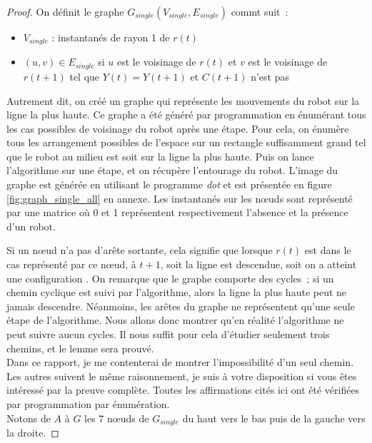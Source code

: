 \begin{proof}
On définit le graphe $G_{single}(V_{single}, E_{single})$ commt suit~:
\begin{itemize}
  \item $V_{single}$ : instantanés de rayon 1 de $r(t)$
  \item $(u,v) \in E_{single}$ si $u$ est le voisinage de $r(t)$ et $v$ est le
  voisinage de $r(t+1)$ tel que $Y(t)=Y(t+1)$ et $C(t+1)$ n'est pas \Gathered
\end{itemize}
Autrement dit, on créé un graphe qui représente les mouvements du robot sur la
ligne la plus haute. Ce graphe a été généré par programmation en énumérant tous
les cas possibles de voisinage du robot après une étape. Pour cela, on énumère
tous les arrangement possibles de l'espace sur un rectangle suffisamment grand
tel que le robot au milieu est soit sur la ligne la plus haute. Puis on lance
l'algorithme sur une étape, et on récupère l'entourage du robot. L'image du
graphe est générée en utilisant le programme \textit{dot} et est présentée en
figure \ref{fig:graph_single_all} en annexe. Les instantanés sur les n\oe{}uds
sont représenté par une matrice où 0 et 1 représentent respectivement l'absence
et la présence d'un robot.

Si un n\oe{}ud n'a pas d'arête sortante, cela signifie que lorsque $r(t)$ est
dans le cas représenté par ce n\oe{}ud, à $t+1$, soit la ligne est descendue,
soit on a atteint une configuration \Gathered. On remarque que le graphe
comporte des cycles~; si un chemin cyclique est suivi par l'algorithme, alors
la ligne la plus haute peut ne jamais descendre. Néanmoins, les arêtes du
graphe ne représentent qu'une seule étape de l'algorithme. Nous allons donc
montrer qu'en réalité l'algorithme ne peut suivre aucun cycles. Il nous suffit
pour cela d'étudier seulement trois chemins, et le lemme sera prouvé. \\

Dans ce rapport, je me contenterai de montrer l'impossibilité d'un seul chemin.
Les autres suivent le même raisonnement, je suis à votre disposition si vous
êtes intéressé par la preuve complète. Toutes les affirmations cités ici ont
été vérifiées par programmation par énumération. \\

Notons de $A$ à $G$ les 7 n\oe{}uds de $G_{single}$ du haut vers le bas puis de
la gauche vers la droite.


\end{proof}
